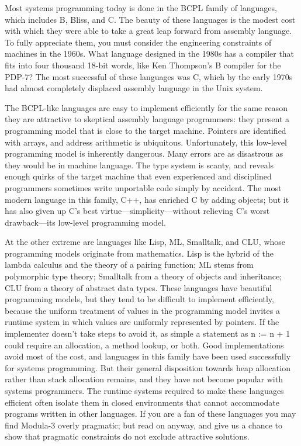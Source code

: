 \documentclass[10pt]{article}
\begin{document}
Most systems programming today is done in the BCPL family of languages, which
includes B, Bliss, and C. The beauty of these languages is the modest cost
with which they were able to take a great leap forward from assembly
language. To fully appreciate them, you must consider the engineering
constraints of machines in the 1960s. What language designed in the 1980s has
a compiler that fits into four thousand 18-bit words, like Ken Thompson's B
compiler for the PDP-7? The most successful of these languages was C, which by
the early 1970s had almost completely displaced assembly language in the Unix
system.

The BCPL-like languages are easy to implement efficiently for the same reason
they are attractive to skeptical assembly language programmers: they present a
programming model that is close to the target machine. Pointers are identified
with arrays, and address arithmetic is ubiquitous. Unfortunately, this
low-level programming model is inherently dangerous. Many errors are as
disastrous as they would be in machine language. The type system is scanty,
and reveals enough quirks of the target machine that even experienced and
disciplined programmers sometimes write unportable code simply by
accident. The most modern language in this family, C++, has enriched C by
adding objects; but it has also given up C's best
virtue---simplicity---without relieving C's worst drawback---its low-level
programming model.

At the other extreme are languages like Lisp, ML, Smalltalk, and CLU, whose
programming models originate from mathematics. Lisp is the hybrid of the
lambda calculus and the theory of a pairing function; ML stems from
polymorphic type theory; Smalltalk from a theory of objects and inheritance;
CLU from a theory of abstract data types. These languages have beautiful
programming models, but they tend to be difficult to implement efficiently,
because the uniform treatment of values in the programming model invites a
runtime system in which values are uniformly represented by pointers. If the
implementer doesn't take steps to avoid it, as simple a statement as n := n +
1 could require an allocation, a method lookup, or both. Good implementations
avoid most of the cost, and languages in this family have been used
successfully for systems programming. But their general disposition towards
heap allocation rather than stack allocation remains, and they have not become
popular with systems programmers. The runtime systems required to make these
languages efficient often isolate them in closed environments that cannot
accommodate programs written in other languages. If you are a fan of these
languages you may find Modula-3 overly pragmatic; but read on anyway, and give
us a chance to show that pragmatic constraints do not exclude attractive
solutions.
\end{document}
